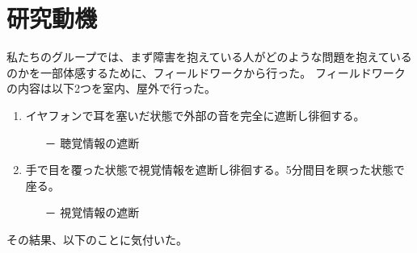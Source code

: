\section{研究動機}
私たちのグループでは、まず障害を抱えている人がどのような問題を抱えているのかを一部体感するために、フィールドワークから行った。
フィールドワークの内容は以下2つを室内、屋外で行った。
\begin{enumerate}
  \item イヤフォンで耳を塞いだ状態で外部の音を完全に遮断し徘徊する。
  \begin{itemize}\item[－] 聴覚情報の遮断\end{itemize}
  \item 手で目を覆った状態で視覚情報を遮断し徘徊する。5分間目を瞑った状態で座る。
  \begin{itemize}\item[－] 視覚情報の遮断\end{itemize}
\end{enumerate}
その結果、以下のことに気付いた。
